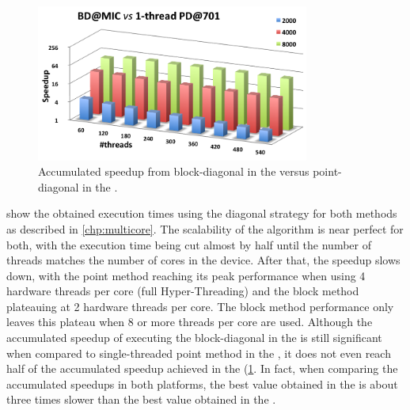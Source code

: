 \documentclass[../thesis]{subfiles}
\begin{document}
	\begin{figure}[t]
		\centering
		\begin{minipage}{0.7\textwidth}
			\centering
			\includegraphics[width=0.8\textwidth]{assets/images/mic/mic-cpu-speedup-accumulated.png}
			\captionsetup{font=small}
			\caption{Accumulated speedup from block-diagonal in the \intel\xeonphi versus point-diagonal in the \cpu.}
			\label{fig:mic:mic-cpu:speedup:accumulated}
		\end{minipage}
	\end{figure}

	 show the obtained execution times using the diagonal strategy for both methods as described in \cref{chp:multicore}. The scalability of the algorithm is near perfect for both, with the execution time being cut almost by half until the number of threads matches the number of cores in the device. After that, the speedup slows down, with the point method reaching its peak performance when using 4 hardware threads per core (full Hyper-Threading) and the block method plateauing at 2 hardware threads per core. The block method performance only leaves this plateau when 8 or more threads per core are used.
	Although the accumulated speedup of executing the block-diagonal in the \intel\xeonphi is still significant when compared to single-threaded point method in the \cpu, it does not even reach half of the accumulated speedup achieved in the \cpu (\cref{fig:mic:mic-cpu:speedup:accumulated}. In fact, when comparing the accumulated speedups in both platforms, the best value obtained in the \intel\xeonphi is about three times slower than the best value obtained in the \cpu.
\end{document}
